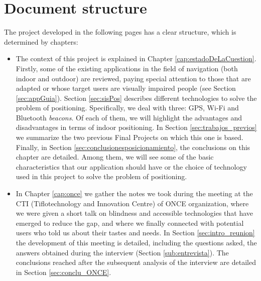 \section{Document structure}

The project developed in the following pages has a clear structure, which is determined by chapters:

\begin{itemize}
	
	\item The context of this project is explained in Chapter \ref{cap:estadoDeLaCuestion}. Firstly, some of the existing applications in the field of navigation (both indoor and outdoor) are reviewed, paying special attention to those that are adapted or whose target users are visually impaired people (see Section \ref{sec:appGuia}). Section \ref{sec:sisPos} describes different technologies to solve the problem of positioning. Specifically, we deal with three: GPS, Wi-Fi and Bluetooth \textit{beacons}. Of each of them, we will highlight the advantages and disadvantages in terms of indoor positioning. In Section \ref{sec:trabajos_previos} we summarize the two previous Final Projects on which this one is based. Finally, in Section \ref{sec:conclusionesposicionamiento}, the conclusions on this chapter are detailed. Among them, we will see some of the basic characteristics that our application should have or the choice of technology used in this project to solve the problem of positioning. 
	
	\item In Chapter \ref{cap:once} we gather the notes we took during the meeting at the CTI (Tiflotechnology and Innovation Centre) of ONCE organization, where we were given a short talk on blindness and accessible technologies that have emerged to reduce the gap, and where we finally connected with potential users who told us about their tastes and needs. In Section \ref{sec:intro_reunion} the development of this meeting is detailed, including the questions asked, the answers obtained during the interview (Section \ref{sub:entrevista}). The conclusions reached after the subsequent analysis of the interview are detailed in Section \ref{sec:conclu_ONCE}. 
	

\end{itemize}
